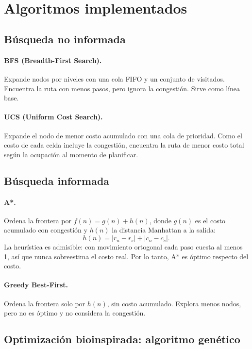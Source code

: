 \documentclass[11pt,a4paper]{article}
\begin{document}
\section{Algoritmos implementados}

\subsection{Búsqueda no informada}

\paragraph{BFS (Breadth-First Search).} Expande nodos por niveles con una cola FIFO y un conjunto de visitados. Encuentra la ruta con menos pasos, pero ignora la congestión. Sirve como línea base.

\paragraph{UCS (Uniform Cost Search).} Expande el nodo de menor costo acumulado con una cola de prioridad. Como el costo de cada celda incluye la congestión, encuentra la ruta de menor costo total según la ocupación al momento de planificar.

\subsection{Búsqueda informada}

\paragraph{A*.} Ordena la frontera por $f(n) = g(n) + h(n)$, donde $g(n)$ es el costo acumulado con congestión y $h(n)$ la distancia Manhattan a la salida:
\begin{equation}
  h(n) = |r_n - r_s| + |c_n - c_s|.
\end{equation}
La heurística es admisible: con movimiento ortogonal cada paso cuesta al menos 1, así que nunca sobreestima el costo real. Por lo tanto, A* es óptimo respecto del costo.

\paragraph{Greedy Best-First.} Ordena la frontera solo por $h(n)$, sin costo acumulado. Explora menos nodos, pero no es óptimo y no considera la congestión.

\subsection{Optimización bioinspirada: algoritmo genético}
\end{document}
